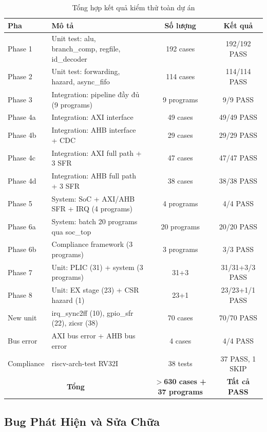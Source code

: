 \begin{table}[htbp]
\caption{Tổng hợp kết quả kiểm thử toàn dự án}
\label{tab:test-summary}
\begin{center}
\begin{tabular}{|l|l|c|c|}
\hline
\textbf{Pha} & \textbf{Mô tả} & \textbf{Số lượng} & \textbf{Kết quả} \\ \hline
Phase 1 & Unit test: alu, branch\_comp, regfile, id\_decoder & 192 cases & 192/192 PASS \\ \hline
Phase 2 & Unit test: forwarding, hazard, async\_fifo & 114 cases & 114/114 PASS \\ \hline
Phase 3 & Integration: pipeline đầy đủ (9 programs) & 9 programs & 9/9 PASS \\ \hline
Phase 4a & Integration: AXI interface & 49 cases & 49/49 PASS \\ \hline
Phase 4b & Integration: AHB interface + CDC & 29 cases & 29/29 PASS \\ \hline
Phase 4c & Integration: AXI full path + 3 SFR & 47 cases & 47/47 PASS \\ \hline
Phase 4d & Integration: AHB full path + 3 SFR & 38 cases & 38/38 PASS \\ \hline
Phase 5 & System: SoC + AXI/AHB SFR + IRQ (4 programs) & 4 programs & 4/4 PASS \\ \hline
Phase 6a & System: batch 20 programs qua soc\_top & 20 programs & 20/20 PASS \\ \hline
Phase 6b & Compliance framework (3 programs) & 3 programs & 3/3 PASS \\ \hline
Phase 7 & Unit: PLIC (31) + system (3 programs) & 31+3 & 31/31+3/3 PASS \\ \hline
Phase 8 & Unit: EX stage (23) + CSR hazard (1) & 23+1 & 23/23+1/1 PASS \\ \hline
New unit & irq\_sync2ff (10), gpio\_sfr (22), zicsr (38) & 70 cases & 70/70 PASS \\ \hline
Bus error & AXI bus error + AHB bus error & 4 cases & 4/4 PASS \\ \hline
Compliance & riscv-arch-test RV32I & 38 tests & 37 PASS, 1 SKIP \\ \hline
\hline
\multicolumn{2}{|c|}{\textbf{Tổng}} & \textbf{$>$630 cases + 37 programs} & \textbf{Tất cả PASS} \\ \hline
\end{tabular}
\end{center}
\end{table}

\subsection{Bug Phát Hiện và Sửa Chữa}

